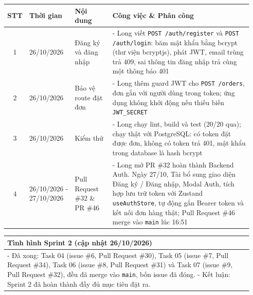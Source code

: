 \documentclass[12pt, a4paper]{article}
\begin{document}
\begin{tabularx}{\textwidth}{|c|p{3.2cm}|Y|Y|}
    \hline
    \textbf{STT} & \textbf{Thời gian} & \textbf{Nội dung} & \textbf{Công việc \& Phân công} \\
    \hline

    1 & 26/10/2026 & Đăng ký và đăng nhập &
    - Long viết \texttt{POST /auth/register} và \texttt{POST /auth/login}: băm mật khẩu bằng bcrypt (thư viện bcryptjs), phát JWT, email trùng trả 409, sai thông tin đăng nhập trả cùng một thông báo 401 \\
    \hline

    2 & 26/10/2026 & Bảo vệ route đặt đơn &
    - Long thêm guard JWT cho \texttt{POST /orders}, đơn gắn với người dùng trong token; ứng dụng không khởi động nếu thiếu biến \texttt{JWT\_SECRET} \\
    \hline

    3 & 26/10/2026 & Kiểm thử &
    - Long chạy lint, build và test (20/20 qua); chạy thật với PostgreSQL: có token đặt được đơn, không có token trả 401, mật khẩu trong database là hash bcrypt \\
    \hline

    4 & 26/10/2026 - 27/10/2026 & Pull Request \#32 \& PR \#46 &
    - Long mở PR \#32 hoàn thành Backend Auth. Ngày 27/10, Tài bổ sung giao diện Đăng ký / Đăng nhập, Modal Auth, tích hợp lưu trữ token với Zustand \texttt{useAuthStore}, tự động gắn Bearer token và kết nối đơn hàng thật; Pull Request \#46 merge vào \texttt{main} lúc 16:51 \\
    \hline
\end{tabularx}

\vspace{0.8cm}

\begin{tabularx}{\textwidth}{|Y|}
    \hline
    \textbf{Tình hình Sprint 2 (cập nhật 26/10/2026)} \\
    \hline
    - Đã xong: Task 04 (issue \#6, Pull Request \#30), Task 05 (issue \#7, Pull Request \#34), Task 06 (issue \#8, Pull Request \#31) và Task 07 (issue \#9, Pull Request \#32), đều đã merge vào \texttt{main}, bốn issue đã đóng. \newline
    - Kết luận: Sprint 2 đã hoàn thành đầy đủ mục tiêu đặt ra. \\
    \hline
\end{tabularx}

\vspace{0.8cm}
\end{document}
